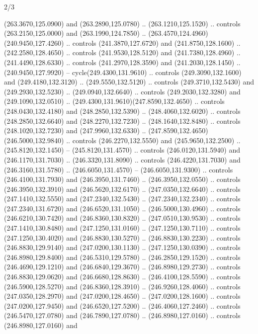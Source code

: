 \begin{flagdescription}{2/3}
\begin{scope}[xshift=0.5\flaglength,yshift=0.5\flagwidth,scale=\flagwidth/259.2]
\begin{scope}[y=0.8pt, x=0.8pt, yscale=-1,shift={(-243,-162)}]
      (263.3670,125.0900) and (263.2890,125.0780) .. (263.1210,125.1520) .. controls
      (263.2150,125.0000) and (263.1990,124.7850) ..
      (263.4570,124.4960)(240.9450,127.4260) .. controls (241.3870,127.6720) and
      (241.8750,128.1600) .. (242.2580,128.4650) .. controls (241.9530,128.5120) and
      (241.7380,128.4960) .. (241.4490,128.6330) .. controls (241.2970,128.3590) and
      (241.2030,128.1450) .. (240.9450,127.9920) -- cycle(249.4300,131.9610) ..
      controls (249.3090,132.1600) and (249.4180,132.3120) .. (249.5550,132.5120) ..
      controls (249.3710,132.5430) and (249.2930,132.5230) .. (249.0940,132.6640) ..
      controls (249.2030,132.3280) and (249.1090,132.0510) ..
      (249.4300,131.9610)(247.8590,132.4650) .. controls (248.0430,132.4180) and
      (248.2850,132.5390) .. (248.4060,132.6020) .. controls (248.2850,132.6640) and
      (248.2270,132.7230) .. (248.1640,132.8480) .. controls (248.1020,132.7230) and
      (247.9960,132.6330) .. (247.8590,132.4650)(246.5000,132.9840) .. controls
      (246.2270,132.5550) and (245.9650,132.2500) .. (245.8120,132.1450) --
      (245.8120,131.4570) .. controls (246.0120,131.5940) and (246.1170,131.7030) ..
      (246.3320,131.8090) .. controls (246.4220,131.7030) and (246.3160,131.5780) ..
      (246.6050,131.4570) -- (246.6050,131.9300) .. controls (246.4100,131.7930) and
      (246.3950,131.7460) .. (246.3950,132.0550) .. controls (246.3950,132.3910) and
      (246.5620,132.6170) .. (247.0350,132.6640) .. controls (247.1410,132.5550) and
      (247.2340,132.5430) .. (247.2340,132.2340) .. controls (247.2340,131.6720) and
      (246.6520,131.1050) .. (246.5000,130.4960) .. controls (246.6210,130.7420) and
      (246.8360,130.8320) .. (247.0510,130.9530) .. controls (247.1410,130.8480) and
      (247.1250,131.0160) .. (247.1250,130.7110) .. controls (247.1250,130.4020) and
      (246.8830,130.5270) .. (246.8830,130.2230) .. controls (246.8830,129.9140) and
      (247.0200,130.1130) .. (247.1250,130.0390) .. controls (246.8980,129.8400) and
      (246.5310,129.5780) .. (246.2850,129.1520) .. controls (246.4690,129.1210) and
      (246.6840,129.3670) .. (246.8980,129.2730) .. controls (246.8830,129.0620) and
      (246.6680,128.8630) .. (246.4100,128.5590) .. controls (246.5900,128.5270) and
      (246.8360,128.3910) .. (246.9260,128.4060) .. controls (247.0350,128.2970) and
      (247.0200,128.4650) .. (247.0200,128.1600) .. controls (247.0200,127.9450) and
      (246.6520,127.5200) .. (246.4060,127.2460) .. controls (246.5470,127.0780) and
      (246.7890,127.0780) .. (246.8980,127.0160) .. controls (246.8980,127.0160) and

\end{scope}
\end{scope}
\end{flagdescription}
